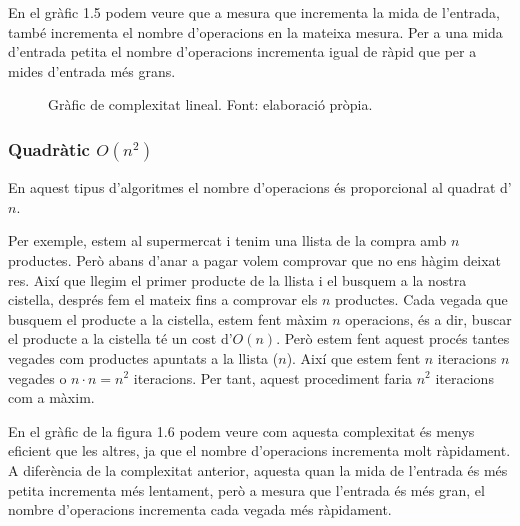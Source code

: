 En el gràfic 1.5 podem veure que a mesura que incrementa la mida de l'entrada, també incrementa el nombre d'operacions en la mateixa mesura. Per a una mida d'entrada petita el nombre d'operacions incrementa igual de ràpid que per a mides d'entrada més grans. 
\begin{figure}[H]
\centering
{}
    \caption[Gràfic de complexitat lineal.]{Gràfic de complexitat lineal. Font: elaboració pròpia.}
    \label{fig:my_label}
\end{figure}

\subsubsection*{Quadràtic $O(n^2)$}
En aquest tipus d'algoritmes el nombre d'operacions és proporcional al quadrat d'$n$. 

Per exemple, estem al supermercat i tenim una llista de la compra amb $n$ productes. Però abans d'anar a pagar volem comprovar que no ens hàgim deixat res. Així que llegim el primer producte de la llista i el busquem a la nostra cistella, després fem el mateix fins a comprovar els $n$ productes. Cada vegada que busquem el producte a la cistella, estem fent màxim $n$ operacions, és a dir, buscar el producte a la cistella té un cost d'$O(n)$. Però estem fent aquest procés tantes vegades com productes apuntats a la llista ($n$). Així que estem fent $n$ iteracions $n$ vegades o $n \cdot n = n^2$ iteracions. Per tant, aquest procediment faria $n^2$ iteracions com a màxim.

En el gràfic de la figura 1.6 podem veure com aquesta complexitat és menys eficient que les altres, ja que el nombre d'operacions incrementa molt ràpidament. A diferència de la complexitat anterior, aquesta quan la mida de l'entrada és més petita incrementa més lentament, però a mesura que l'entrada és més gran, el nombre d'operacions incrementa cada vegada més ràpidament. 

